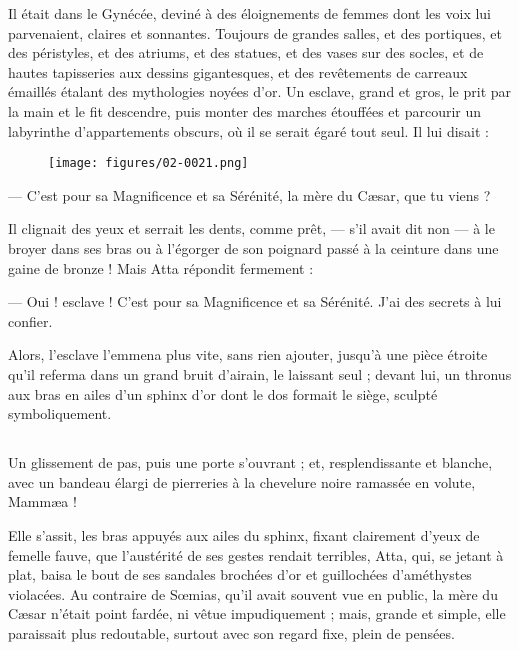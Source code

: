 \documentclass[a4paper, 11pt, oneside, polutonikogreek, french]{article}
\begin{document}
Il était dans le Gynécée, deviné à des éloignements de femmes dont les voix lui parvenaient, claires et sonnantes. Toujours de grandes salles, et des portiques, et des péristyles, et des atriums, et des statues, et des vases sur des socles, et de hautes tapisseries aux dessins gigantesques, et des revêtements de carreaux émaillés étalant des mythologies noyées d'or. Un esclave, grand et gros, le prit par la main et le fit descendre, puis monter des marches étouffées et parcourir un labyrinthe d'appartements obscurs, où il se serait égaré tout seul. Il lui disait :
\begin{figure}[H]
\centering
\texttt{[image: figures/02-0021.png]}
\end{figure}
--- C'est pour sa Magnificence et sa Sérénité, la mère du Cæsar, que tu viens ?

Il clignait des yeux et serrait les dents, comme prêt, --- s'il avait dit non --- à le broyer dans ses bras ou à l'égorger de son poignard passé à la ceinture dans une gaine de bronze ! Mais Atta répondit fermement :

--- Oui ! esclave ! C'est pour sa Magnificence et sa Sérénité. J'ai des secrets à lui confier.

Alors, l'esclave l'emmena plus vite, sans rien ajouter, jusqu'à une pièce étroite qu'il referma dans un grand bruit d'airain, le laissant seul ; devant lui, un thronus aux bras en ailes d'un sphinx d'or dont le dos formait le siège, sculpté symboliquement.
\clearpage
\subsection{}
\paragraph{}
Un glissement de pas, puis une porte s'ouvrant ; et, resplendissante et blanche, avec un bandeau élargi de pierreries à la chevelure noire ramassée en volute, Mammæa !

Elle s'assit, les bras appuyés aux ailes du sphinx, fixant clairement d'yeux de femelle fauve, que l'austérité de ses gestes rendait terribles, Atta, qui, se jetant à plat, baisa le bout de ses sandales brochées d'or et guillochées d'améthystes violacées. Au contraire de Sœmias, qu'il avait souvent vue en public, la mère du Cæsar n'était point fardée, ni vêtue impudiquement ; mais, grande et simple, elle paraissait plus redoutable, surtout avec son regard fixe, plein de pensées.
\end{document}
